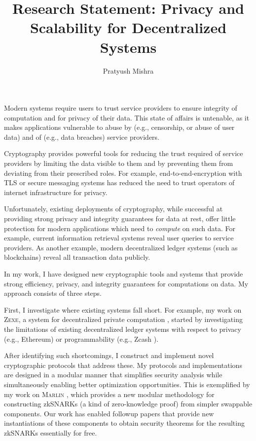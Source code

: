 \documentclass[11pt,letterpaper]{article}
\theoremstyle{definition} %
\theoremstyle{remark} %
\newcommand{\zexe}{\textsc{Zexe}}
\newcommand{\marlin}{\textsc{Marlin}}
\begin{document}

\title{Research Statement: Privacy and Scalability for Decentralized Systems}
\author{Pratyush Mishra}
\date{}


\maketitle
\vspace{-1cm}

Modern systems require users to trust service providers to ensure integrity of computation and for privacy of their data. 
This state of affairs is untenable, as it makes applications vulnerable to abuse by (e.g., censorship, or abuse of user data) and of (e.g., data breaches) service providers.

Cryptography provides powerful tools for reducing the trust required of service providers by limiting the data visible to them and by preventing them from deviating from their prescribed roles. 
For example, end-to-end-encryption with TLS or secure messaging systems has reduced the need to trust operators of internet infrastructure for privacy.

Unfortunately, existing deployments of cryptography, while successful at providing strong privacy and integrity guarantees for data at rest, offer little protection for modern applications which need to \emph{compute} on such data.
For example, current information retrieval systems reveal user queries to service providers.
As another example, modern decentralized ledger systems (such as blockchains) reveal all transaction data publicly.

In my work, I have designed new cryptographic tools and systems that provide strong efficiency, privacy, and integrity guarantees for computations on data.
My approach consists of three steps. 

First, I investigate where existing systems fall short. For example, my work on \zexe{}, a system for decentralized private computation \cite{BoweCGMMW20}, started by investigating the limitations of existing decentralized ledger systems with respect to privacy (e.g., Ethereum) or programmability (e.g., Zcash \cite{ZCashCo}). 

After identifying such shortcomings, I construct and implement novel cryptographic protocols that address these. My protocols and implementations are designed in a modular manner that simplifies security analysis while simultaneously enabling better optimization opportunities. This is exemplified by my work on \marlin{} \cite{ChiesaHMMVW20}, which provides a new modular methodology for constructing zkSNARKs (a kind of zero-knowledge proof) from simpler swappable components. Our work has enabled followup papers that provide new instantiations of these components to obtain security theorems for the resulting zkSNARKs essentially for free.
\end{document}

